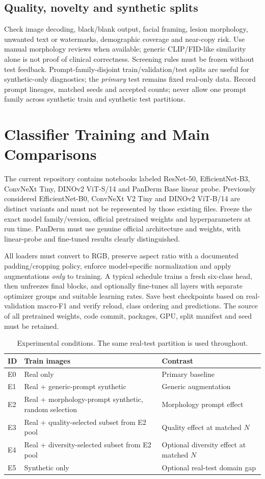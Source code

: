 \documentclass[11pt,a4paper]{article}
\begin{document}
\subsection{Quality, novelty and synthetic splits}
Check image decoding, black/blank output, facial framing, lesion morphology, unwanted text or watermarks, demographic coverage and near-copy risk. Use manual morphology reviews when available; generic CLIP/FID-like similarity alone is not proof of clinical correctness. Screening rules must be frozen without test feedback. Prompt-family-disjoint train/validation/test splits are useful for synthetic-only diagnostics; the \emph{primary} test remains fixed real-only data. Record prompt lineages, matched seeds and accepted counts; never allow one prompt family across synthetic train and synthetic test partitions.

\section{Classifier Training and Main Comparisons}
The current repository contains notebooks labeled ResNet-50, EfficientNet-B3, ConvNeXt Tiny, DINOv2 ViT-S/14 and PanDerm Base linear probe. Previously considered EfficientNet-B0, ConvNeXt V2 Tiny and DINOv2 ViT-B/14 are distinct variants and must not be represented by those existing files. Freeze the exact model family/version, official pretrained weights and hyperparameters at run time. PanDerm must use genuine official architecture and weights, with linear-probe and fine-tuned results clearly distinguished.

All loaders must convert to RGB, preserve aspect ratio with a documented padding/cropping policy, enforce model-specific normalization and apply augmentations \emph{only} to training. A typical schedule trains a fresh six-class head, then unfreezes final blocks, and optionally fine-tunes all layers with separate optimizer groups and suitable learning rates. Save best checkpoints based on real-validation macro-F1 and verify reload, class ordering and predictions. The source of all pretrained weights, code commit, packages, GPU, split manifest and seed must be retained.

\begin{table}[ht]\centering\small\caption{Experimental conditions. The same real-test partition is used throughout.}
\begin{tabularx}{\linewidth}{lX X}\toprule ID & Train images & Contrast\\\midrule
E0 & Real only & Primary baseline\\
E1 & Real + generic-prompt synthetic & Generic augmentation\\
E2 & Real + morphology-prompt synthetic, random selection & Morphology prompt effect\\
E3 & Real + quality-selected subset from E2 pool & Quality effect at matched $N$\\
E4 & Real + diversity-selected subset from E2 pool & Optional diversity effect at matched $N$\\
E5 & Synthetic only & Optional real-test domain gap\\\bottomrule
\end{tabularx}\end{table}
\end{document}
